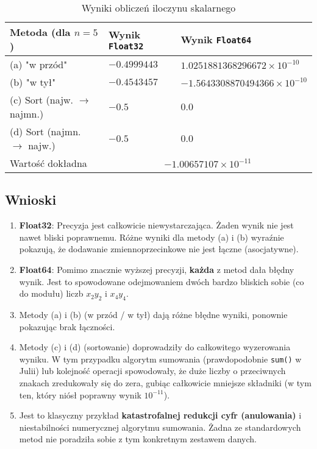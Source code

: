 \documentclass{article}
\begin{document}
\begin{table}[!htbp]
\centering
\caption{Wyniki obliczeń iloczynu skalarnego}
\label{tab:iloczyn}
\begin{tabular}{lll}
\toprule
Metoda (dla $n=5$) & Wynik \texttt{Float32} & Wynik \texttt{Float64} \\
\midrule
(a) "w przód" & $-0.4999443$ & $1.0251881368296672 \times 10^{-10}$ \\
(b) "w tył" & $-0.4543457$ & $-1.5643308870494366 \times 10^{-10}$ \\
(c) Sort (najw. $\rightarrow$ najmn.) & $-0.5$ & $0.0$ \\
(d) Sort (najmn. $\rightarrow$ najw.) & $-0.5$ & $0.0$ \\
\midrule
Wartość dokładna & \multicolumn{2}{c}{$-1.00657107 \times 10^{-11}$} \\
\bottomrule
\end{tabular}
\end{table}

\subsection{Wnioski}
\begin{enumerate}
    \item \textbf{Float32}: Precyzja jest całkowicie niewystarczająca. Żaden wynik nie jest nawet bliski poprawnemu. Różne wyniki dla metody (a) i (b) wyraźnie pokazują, że dodawanie zmiennoprzecinkowe nie jest łączne (asocjatywne).
    \item \textbf{Float64}: Pomimo znacznie wyższej precyzji, \textbf{każda} z metod dała błędny wynik. Jest to spowodowane odejmowaniem dwóch bardzo bliskich sobie (co do modułu) liczb $x_2y_2$ i $x_4y_4$.
    \item Metody (a) i (b) (w przód / w tył) dają różne błędne wyniki, ponownie pokazując brak łączności.
    \item Metody (c) i (d) (sortowanie) doprowadziły do całkowitego wyzerowania wyniku. W tym przypadku algorytm sumowania (prawdopodobnie \texttt{sum()} w Julii) lub kolejność operacji spowodowały, że duże liczby o przeciwnych znakach zredukowały się do zera, gubiąc całkowicie mniejsze składniki (w tym ten, który niósł poprawny wynik $10^{-11}$).
    \item Jest to klasyczny przykład \textbf{katastrofalnej redukcji cyfr (anulowania)} i niestabilności numerycznej algorytmu sumowania. Żadna ze standardowych metod nie poradziła sobie z tym konkretnym zestawem danych.
\end{enumerate}
\end{document}
